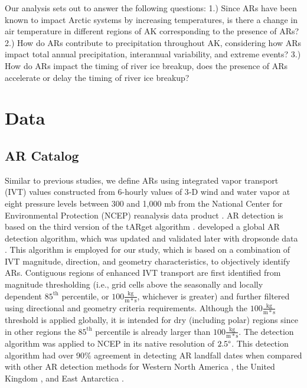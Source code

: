 \documentclass[12pts,draft]{AR_analysis_}
\begin{document}
Our analysis sets out to answer the following questions: 
1.) Since ARs have been known to impact Arctic systems by increasing 
temperatures, is there a change in
air temperature in different regions of AK corresponding to the 
presence of ARs?
2.) How do ARs contribute to precipitation throughout AK, 
considering how ARs impact total annual precipitation, interannual 
variability, and extreme events?
3.) How do ARs impact the timing of river ice breakup, does the presence 
of ARs accelerate or delay the timing of river ice breakup?

\section{Data}

\subsection{AR Catalog}

Similar to previous studies, we define ARs using integrated vapor
transport (IVT) values constructed from 6-hourly values of 3‐D wind and
water vapor at eight pressure levels between 300 and 1,000
mb from the National Center for Environmental Protection (NCEP) 
reanalysis data product \cite{NCEP_NCAR_reanalysis}. 
AR detection is based on the third version of the tARget algorithm
\cite{Guan_Waliser2019, bin2022}.
 developed a global
AR detection algorithm, which was updated and validated later with
dropsonde data \cite{guan2018}. This algorithm is employed for
our study, which is based on a combination of IVT magnitude,
direction, and geometry characteristics, to objectively identify ARs.
Contiguous regions of enhanced IVT transport are first identified from
magnitude thresholding (i.e., grid cells above the seasonally
and locally dependent $85^{\text{th}}$ percentile, or 
$\mathrm{100\frac{kg}{m*s}}$, 
whichever is greater) and further filtered
using directional and geometry criteria requirements. Although the 
$\mathrm{100\frac{kg}{m*s}}$ threshold is applied globally, it is intended for 
dry (including polar) regions since in other regions the $85^{\text{th}}$ percentile 
is already larger than $\mathrm{100\frac{kg}{m*s}}$. The detection
algorithm was applied to NCEP in its native resolution of $2.5 \degree$.
This detection algorithm had over 90\% agreement in detecting AR
landfall dates when compared with other AR detection methods for Western
North America \cite{Neiman2008}, the United Kingdom \cite{Lavers2011}, 
and East Antarctica \cite{Gorodetskaya2014}. 
\end{document}

